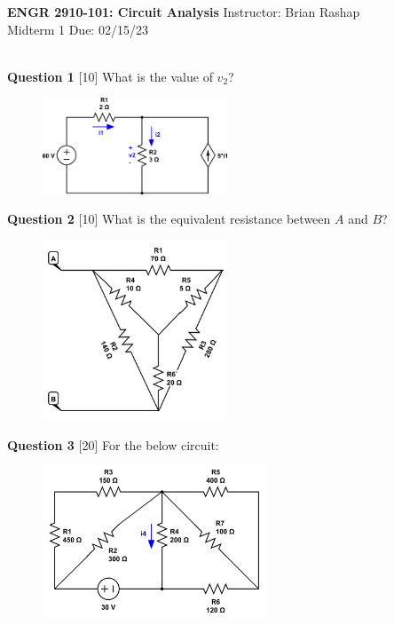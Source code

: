 \documentclass[12pt]{article}
\begin{document}
\begin{center}
\hfil
{\large\bf {ENGR 2910-101: Circuit Analysis}}
\hfill Instructor: Brian Rashap\\
Midterm 1  \hfill Due: 02/15/23\\
\hrulefill\\
\end{center}

{\bf Question 1} [10]
\newline
What is the value of $v_2$?

\begin{figure}[h!]
\centering 
\includegraphics[clip,width=0.49\textwidth]{mid1_1.png}
\end{figure}

{\bf Question 2} [10] 
\newline
What is the equivalent resistance between $A$ and $B$?

\begin{figure}[h!]
  \centering 
 \vspace{-0.1in}
 \includegraphics[clip,width=0.49\textwidth]{mid1_2.jpg}
\vspace{-0.1in}
\end{figure}


\newpage
{\bf Question 3} [20] 
\newline
For the below circuit:

\begin{figure}[h!]
     \centering
\vspace{-0.1in}
       \includegraphics[clip,width=0.6\textwidth]{mid1_4.jpg}
\vspace{-0.15in}
\end{figure}
\end{document}
